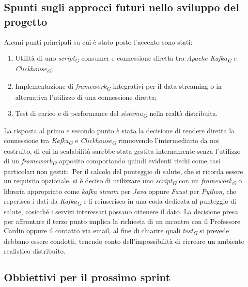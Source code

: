 \documentclass{article}
\begin{document}
    \subsection{Spunti sugli approcci futuri nello sviluppo del progetto}
    Alcuni punti principali su cui è stato posto l'accento sono stati:
        \begin{enumerate}
        \item Utilità di uno \textit{script}\textsubscript{\textit{G}} consumer e connessione diretta tra \textit{Apache Kafka}\textsubscript{\textit{G}} e \textit{Clickhouse}\textsubscript{\textit{G}};
        \item Implementazione di \textit{framework}\textsubscript{\textit{G}} integrativi per il data streaming o in alternativa l'utilizzo di una connessione diretta;
        \item Test di carico e di performance del \textit{sistema}\textsubscript{\textit{G}} nella realtà distribuita.
        \end{enumerate}
    
        La risposta al primo e secondo punto è stata la decisione di rendere diretta la connessione tra \textit{Kafka}\textsubscript{\textit{G}} e \textit{Clickhouse}\textsubscript{\textit{G}} rimuovendo l'intermediario da noi costruito, di cui la scalabilità sarebbe stata gestita internamente senza l'utilizzo di un \textit{framework}\textsubscript{\textit{G}} apposito comportando quindi evidenti rischi come casi particolari non gestiti. Per il calcolo del punteggio di salute, che si ricorda essere un requisito opzionale, si è deciso di utilizzare uno \textit{script}\textsubscript{\textit{G}} con un \textit{framework}\textsubscript{\textit{G}} o libreria appropriato come \textit{kafka stream} per \textit{Java} oppure \textit{Faust} per \textit{Python}, che reperisca i dati da \textit{Kafka}\textsubscript{\textit{G}} e li reinserisca in una coda dedicata al punteggio di salute, cosicché i servizi interessati possano ottenere il dato.
        La decisione presa per affrontare il terzo punto implica la richiesta di un incontro con il Professore Cardin oppure il contatto via email, al fine di chiarire quali \textit{test}\textsubscript{\textit{G}} si prevede debbano essere condotti, tenendo conto dell'impossibilità di ricreare un ambiente realistico distribuito.
    
    \pagebreak
   
    \subsection{Obbiettivi per il prossimo sprint}
    
\end{document}
